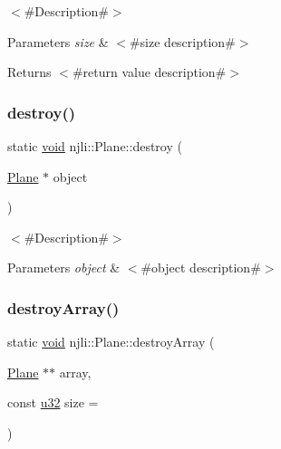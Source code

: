$<$\#\+Description\#$>$


\begin{DoxyParams}{Parameters}
{\em size} & $<$\#size description\#$>$\\
\hline
\end{DoxyParams}
\begin{DoxyReturn}{Returns}
$<$\#return value description\#$>$ 
\end{DoxyReturn}
\mbox{\label{classnjli_1_1_plane_a30b48bc2acf03778e7024f93735a9fe2}} 
\subsubsection{\texorpdfstring{destroy()}{destroy()}}
{\footnotesize\ttfamily static \mbox{\hyperlink{_thread_8h_af1e856da2e658414cb2456cb6f7ebc66}{void}} njli\+::\+Plane\+::destroy (\begin{DoxyParamCaption}\item[{\mbox{\hyperlink{classnjli_1_1_plane}{Plane}} $\ast$}]{object }\end{DoxyParamCaption})\hspace{0.3cm}{\ttfamily [static]}}

$<$\#\+Description\#$>$


\begin{DoxyParams}{Parameters}
{\em object} & $<$\#object description\#$>$ \\
\hline
\end{DoxyParams}
\mbox{\label{classnjli_1_1_plane_a5f1fa3ef1069b6ece075986d7c29a7e5}} 
\subsubsection{\texorpdfstring{destroy\+Array()}{destroyArray()}}
{\footnotesize\ttfamily static \mbox{\hyperlink{_thread_8h_af1e856da2e658414cb2456cb6f7ebc66}{void}} njli\+::\+Plane\+::destroy\+Array (\begin{DoxyParamCaption}\item[{\mbox{\hyperlink{classnjli_1_1_plane}{Plane}} $\ast$$\ast$}]{array,  }\item[{const \mbox{\hyperlink{_util_8h_a10e94b422ef0c20dcdec20d31a1f5049}{u32}}}]{size = {} }\end{DoxyParamCaption})\hspace{0.3cm}{\ttfamily [static]}}

